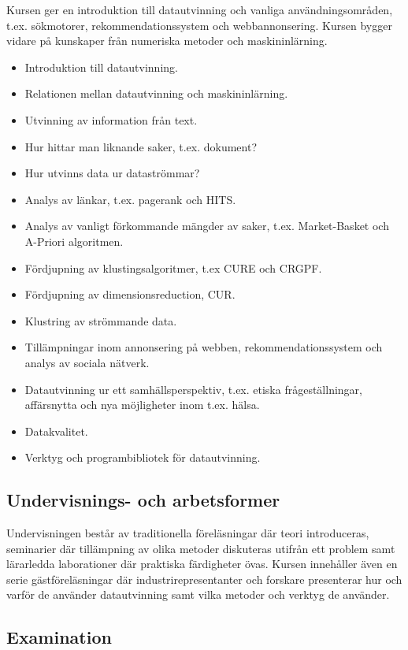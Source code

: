 Kursen ger en introduktion till datautvinning och vanliga
användningsområden, t.ex. sökmotorer, rekommendationssystem och
webbannonsering. Kursen bygger vidare på kunskaper från numeriska
metoder och maskininlärning.

\begin{itemize}
\tightlist
\item
  Introduktion till datautvinning.
\item
  Relationen mellan datautvinning och maskininlärning.
\item
  Utvinning av information från text.
\item
  Hur hittar man liknande saker, t.ex. dokument?
\item
  Hur utvinns data ur dataströmmar?
\item
  Analys av länkar, t.ex. pagerank och HITS.
\item
  Analys av vanligt förkommande mängder av saker, t.ex. Market-Basket
  och A-Priori algoritmen.
\item
  Fördjupning av klustingsalgoritmer, t.ex CURE och CRGPF.
\item
  Fördjupning av dimensionsreduction, CUR.
\item
  Klustring av strömmande data.
\item
  Tillämpningar inom annonsering på webben, rekommendationssystem och
  analys av sociala nätverk.
\item
  Datautvinning ur ett samhällsperspektiv, t.ex. etiska
  frågeställningar, affärsnytta och nya möjligheter inom t.ex. hälsa.
\item
  Datakvalitet.
\item
  Verktyg och programbibliotek för datautvinning.
\end{itemize}

\subsection*{Undervisnings- och
arbetsformer}

Undervisningen består av traditionella föreläsningar där teori
introduceras, seminarier där tillämpning av olika metoder diskuteras
utifrån ett problem samt lärarledda laborationer där praktiska
färdigheter övas. Kursen innehåller även en serie gästföreläsningar där
industrirepresentanter och forskare presenterar hur och varför de
använder datautvinning samt vilka metoder och verktyg de använder.

\subsection*{Examination}

